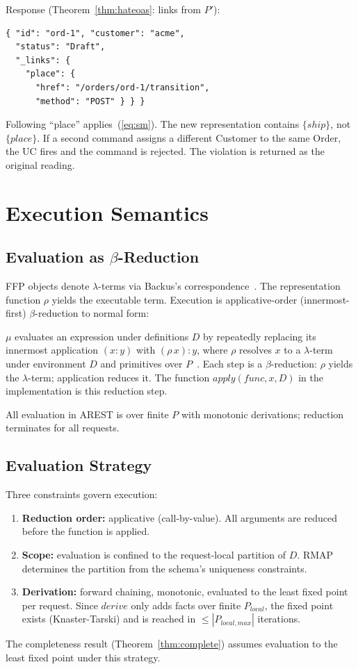 \documentclass[acmsmall,screen,review]{acmart}
\begin{document}
Response (Theorem~\ref{thm:hateoas}: links from $P'$):
\begin{lstlisting}
{ "id": "ord-1", "customer": "acme",
  "status": "Draft",
  "_links": {
    "place": {
      "href": "/orders/ord-1/transition",
      "method": "POST" } } }
\end{lstlisting}

Following ``place'' applies~(\ref{eq:sm}). The new representation contains $\{\mathit{ship}\}$, not $\{\mathit{place}\}$. If a second command assigns a different Customer to the same Order, the UC fires and the command is rejected. The violation is returned as the original reading.

\section{Execution Semantics}

\subsection{Evaluation as $\beta$-Reduction}

FFP objects denote $\lambda$-terms via Backus's correspondence~\cite[Sec.\,12.9]{backus78}. The representation function $\rho$ yields the executable term. Execution is applicative-order (innermost-first) $\beta$-reduction to normal form:

$\mu$ evaluates an expression under definitions $D$ by repeatedly replacing its innermost application $(x\!:\!y)$ with $(\rho\,x)\!:\!y$, where $\rho$ resolves $x$ to a $\lambda$-term under environment $D$ and primitives over $P$~\cite[Sec.\,13.3.1]{backus78}. Each step is a $\beta$-reduction: $\rho$ yields the $\lambda$-term; application reduces it. The function $\mathit{apply}(\mathit{func}, x, D)$ in the implementation is this reduction step.

All evaluation in AREST is over finite $P$ with monotonic derivations; reduction terminates for all requests.

\subsection{Evaluation Strategy}

Three constraints govern execution:
\begin{enumerate}[nosep]
\item \textbf{Reduction order:} applicative (call-by-value). All arguments are reduced before the function is applied.
\item \textbf{Scope:} evaluation is confined to the request-local partition of $D$. RMAP~\cite[Ch.\,17]{halpin08} determines the partition from the schema's uniqueness constraints.
\item \textbf{Derivation:} forward chaining, monotonic, evaluated to the least fixed point per request. Since $\mathit{derive}$ only adds facts over finite $P_{\mathit{local}}$, the fixed point exists (Knaster-Tarski) and is reached in $\leq |P_{\mathit{local,max}}|$ iterations.
\end{enumerate}
The completeness result (Theorem~\ref{thm:complete}) assumes evaluation to the least fixed point under this strategy.
\end{document}

